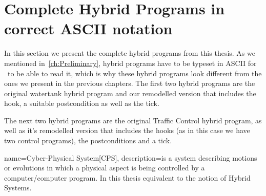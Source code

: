 \section{Complete Hybrid Programs in correct ASCII notation}
\label{app:sec:pdfs}

In this section we present the complete hybrid programs from this thesis. As we mentioned in~\ref{ch:Preliminary}, hybrid programs have to be typeset in ASCII for \keym~to be able to read it, which is why these hybrid programs look different from the ones we present in the previous chapters. The first two hybrid programs are the original watertank hybrid program and our remodelled version that includes the hook, a suitable postcondition as well as the tick.




The next two hybrid programs are the original Traffic Control hybrid program, as well as it's remodelled version that includes the hooks (as in this case we have two control programs), the postconditions and a tick.




 {
 name=Cyber-Physical System[CPS],
 description={is a system describing motions or evolutions in which a physical aspect is being controlled by a computer/computer program. In this thesis equivalent to the notion of Hybrid Systems.}
}




